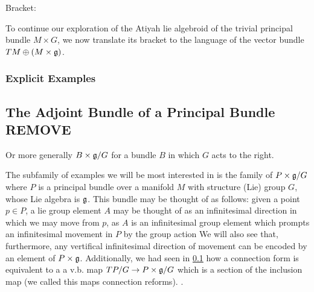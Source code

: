 Bracket:

To continue our exploration of the Atiyah lie algebroid of the trivial principal bundle $M \times G$, we now translate its bracket to the language of the vector bundle $TM \oplus (M \times \mathfrak{g})$. 

\subsubsection{Explicit Examples}



\subsection{The Adjoint Bundle of a Principal Bundle REMOVE}

Or more generally $B \times \mathfrak{g} / G$ for a bundle $B$ in which $G$ acts to the right.

The subfamily of examples we will be most interested in is the family of $P \times \mathfrak{g}/G$ where $P$ is a principal bundle over a manifold $M$ with structure (Lie) group $G$, whose Lie  algebra is $\mathfrak{g}$. This bundle may be thought of as follows: given a point $p \in P$, a lie group element $A$ may be thought of as an infinitesimal direction in which we may move from $p$, as $A$ is an infinitesimal group element which prompts an infinitesimal movement in $P$ by the group action We will also see that, furthermore, any vertifical infinitesimal direction of movement can be encoded by an element of $P \times \mathfrak{g}$. Additionally, we had seen in \ref{} how a connection form is equivalent to a  a v.b. map $TP/G \to P \times \mathfrak{g}/G$ which is a section of the inclusion map (we called this maps connection reforms). .


